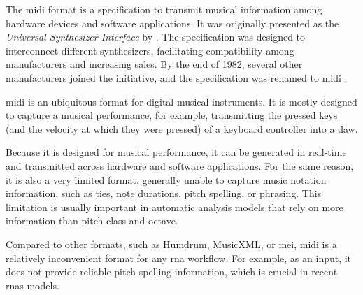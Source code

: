 


The \gls{midi} format is a specification to transmit musical
information among hardware devices and software
applications. It was originally presented as the
\emph{Universal Synthesizer Interface} by
\textcite{smith1981usi}. The specification was designed to
interconnect different synthesizers, facilitating
compatibility among manufacturers and increasing sales. By
the end of 1982, several other manufacturers joined the
initiative, and the specification was renamed to \gls{midi}
\parencite{moog1986midi}.


\gls{midi} is an ubiquitous format for digital musical
instruments. It is mostly designed to capture a musical
performance, for example, transmitting the pressed keys (and
the velocity at which they were pressed) of a keyboard
controller into a \gls{daw}.

Because it is designed for musical performance, it can be
generated in real-time and transmitted across hardware and
software applications. For the same reason, it is also a
very limited format, generally unable to capture music
notation information, such as ties, note durations, pitch
spelling, or phrasing. This limitation is usually important
in automatic analysis models that rely on more information
than pitch class and octave.



Compared to other formats, such as Humdrum, MusicXML, or \gls{mei}, \gls{midi} is a relatively inconvenient format for any \gls{rna} workflow. For example, as an input, it does not provide reliable pitch spelling information, which is crucial in recent \glspl{rna} models.
